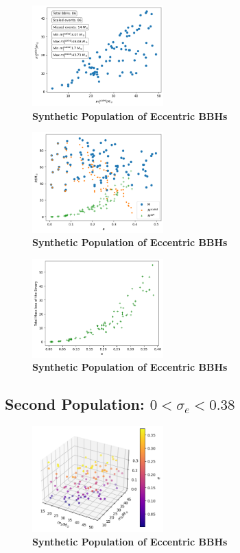 \documentclass[twocolumn,prd,nofootinbib]{revtex4}
\begin{document}
\begin{figure}
\includegraphics[width=0.45\textwidth]{paper/figures/pop2d05scl.png}
\caption{\label{fig:population05}\textbf{Synthetic Population of Eccentric BBHs}}
\end{figure}
\begin{figure}
\includegraphics[width=0.45\textwidth]{paper/figures/pop2d05diff.png}
\caption{\label{fig:population05}\textbf{Synthetic Population of Eccentric BBHs}}
\end{figure}
\begin{figure}
\includegraphics[width=0.45\textwidth]{paper/figures/massloss05.png}
\caption{\label{fig:population05}\textbf{Synthetic Population of Eccentric BBHs}}
\end{figure}





\subsection{Second Population: $0<\sigma_e<0.38$}


\begin{figure}
\includegraphics[width=0.45\textwidth]{paper/figures/pop3d038.png}
\caption{\label{fig:population05}\textbf{Synthetic Population of Eccentric BBHs}}
\end{figure}
\end{document}

